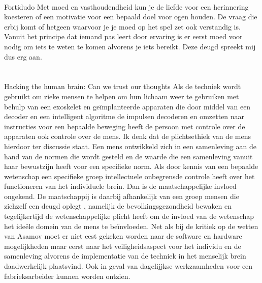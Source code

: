 \documentclass[11pt]{report}
\begin{document}
\paragraph{}
Fortidudo
Met moed en vasthoudendheid kun je de liefde voor een herinnering koesteren of een motivatie voor een bepaald doel voor ogen houden. De vraag die erbij komt of hetgeen waarvoor je je moed op het spel zet ook verstandig is. Vanuit het principe dat iemand pas leert door ervaring is er eerst moed voor nodig om iets te weten te komen alvorens je iets bereikt. Deze deugd spreekt mij dus erg aan.


\section{}
Hacking the human brain: Can we trust our thoughts
Als de techniek wordt gebruikt om zieke mensen te helpen om hun lichaam weer te gebruiken met behulp van een exoskelet en  geïmplanteerde apparaten die door middel van een decoder en een intelligent algoritme de impulsen decoderen en omzetten naar instructies voor een bepaalde beweging heeft de persoon met controle over de apparaten ook controle over de mens. 
Ik denk dat de plichtsethiek van de mens hierdoor ter discussie staat. 
Een mens ontwikkeld zich in een samenleving aan de hand van de normen die wordt gesteld en de waarde die een samenleving vanuit haar bewustzijn heeft voor een specifieke norm. Als door kennis van een bepaalde wetenschap een specifieke groep intellectuele onbegrensde controle heeft over het functioneren van het individuele brein. Dan is de maatschappelijke invloed ongekend. De maatschappij is daarbij afhankelijk van een groep mensen  die zichzelf een deugd oplegt , namelijk de bevolkingsgezondheid bewaken en tegelijkertijd de wetenschappelijke plicht heeft om de invloed van de wetenschap het ideële domein van de mens te beïnvloeden. Net als bij de kritiek op de wetten van Asamov moet er niet eest gekeken worden naar de software en hardware mogelijkheden maar eerst naar het veiligheidsaspect voor het individu en de samenleving alvorens de implementatie van de techniek in het menselijk brein daadwerkelijk plaatsvind.
Ook in geval van dagelijjkse werkzaamheden voor een fabrieksarbeider kunnen worden ontzien.
\end{document}
